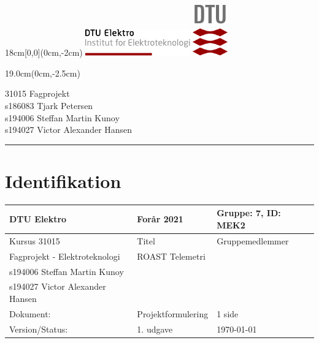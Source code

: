 \documentclass[]{article}
\begin{document}
\thispagestyle{empty}
\vspace*{-1.9cm}
\begin{textblock*}{18cm}[0,0](0cm,-2cm) %
  \noindent
  \includegraphics[width=4.5cm,valign=t]{documentation/resources/tex_dtu_elektro_a.pdf}
  \hspace*{10.6cm}
  \includegraphics[width=1.5cm,valign=t]{documentation/resources/tex_dtu_logo.pdf}
\end{textblock*}
\begin{textblock*}{19.0cm}(0cm,-2.5cm) %
\begin{center}
  {\color{dtured}\large31015 Fagprojekt}\\
  \normalsize
  s186083 Tjark Petersen\\
  s194006 Steffan Martin Kunoy\\
  s194027 Victor Alexander Hansen\\
\end{center}
\end{textblock*}
\vspace{1mm}
{\hspace*{-0.1cm}
\color{dtured}\noindent \rule{16.8cm}{5pt}}
 
 \section*{Identifikation}
 
 \begin{table}[H]
     \centering
     \begin{tabularx}{\textwidth}{|X|X|X|}
     \hline
          DTU Elektro&Forår 2021 & Gruppe: 7, ID: MEK2 \\\hline
          Kursus 31015 & Titel & Gruppemedlemmer \\\hline
          Fagprojekt - Elektroteknologi & ROAST Telemetri & \begin{tabular}{l} s186083 Tjark Petersen\\s194006 Steffan Martin Kunoy\\s194027 Victor Alexander Hansen \end{tabular}\\\hline
          Dokument:& Projektformulering & 1 side\\\hline 
          Version/Status: & 1. udgave &\today\\\hline
     \end{tabularx}
 \end{table}
 
\end{document}
